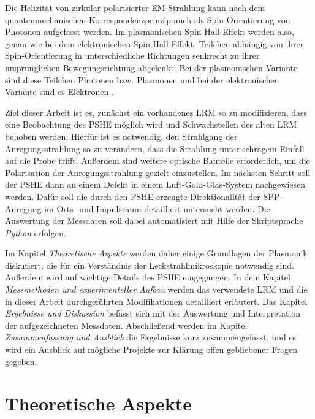 \documentclass[a4paper, titlepage,  ngerman]{book}
\begin{document}
	Die Helizität von zirkular-polarisierter EM-Strahlung kann nach dem quantenmechanischen Korrespondenzprinzip auch als Spin-Orientierung von Photonen aufgefasst werden.	Im plasmonischen Spin-Hall-Effekt werden also, genau wie bei dem elektronischen Spin-Hall-Effekt, Teilchen abhängig von ihrer Spin-Orientierung in unterschiedliche Richtungen senkrecht zu ihrer ursprünglichen Bewegungsrichtung abgelenkt. Bei der plasmonischen Variante sind diese Teilchen Photonen bzw. Plasmonen und bei der elektronischen Variante sind es Elektronen \cite{Inoue.2005}.
	
	Ziel dieser Arbeit ist es, zunächst ein vorhandenes LRM so zu modifizieren, dass eine Beobachtung des PSHE möglich wird und Schwachstellen des alten LRM behoben werden. Hierfür ist es notwendig, den Strahlgang der Anregungsstrahlung so zu verändern, dass die Strahlung unter schrägem Einfall auf die Probe trifft. Außerdem sind weitere optische Bauteile erforderlich, um die Polarisation der Anregungsstrahlung gezielt einzustellen. Im nächsten Schritt soll der PSHE dann an einem Defekt in einem Luft-Gold-Glas-System nachgewiesen werden. Dafür soll die durch den PSHE erzeugte Direktionalität der SPP-Anregung im Orts- und Impulsraum detailliert untersucht werden. Die Auswertung der Messdaten soll dabei automatisiert mit Hilfe der Skriptsprache \textit{Python} erfolgen.
	
	Im Kapitel \textit{Theoretische Aspekte} werden daher einige Grundlagen der Plasmonik diskutiert, die für ein Verständnis der Leckstrahlmikroskopie notwendig sind. Außerdem wird auf wichtige Details des PSHE eingegangen. In dem Kapitel \textit{Messmethoden und experimenteller Aufbau} werden das verwendete LRM und die in dieser Arbeit durchgeführten Modifikationen detailliert erläutert. Das Kapitel \textit{Ergebnisse und Diskussion} befasst sich mit der Auswertung und Interpretation der aufgezeichneten Messdaten.  Abschließend werden im Kapitel \textit{Zusammenfassung und Ausblick} die Ergebnisse kurz zusammengefasst, und es wird ein Ausblick auf mögliche Projekte zur Klärung offen gebliebener Fragen gegeben.
	
	\newpage	
	\chapter{Theoretische Aspekte}
\end{document}
